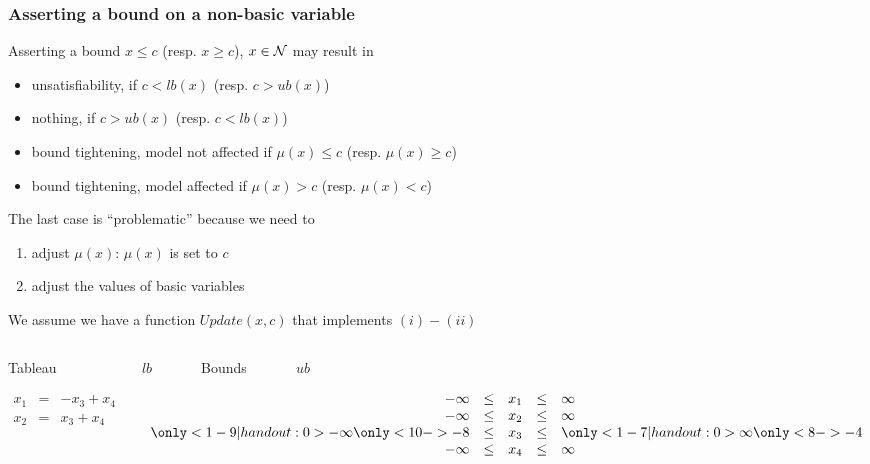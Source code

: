 \begin{frame}
  \frametitle{Asserting a bound on a non-basic variable}

  \scriptsize

  Asserting a bound $x \leq c$ (resp. $x \geq c$), $x \in \mathcal{N}$ may result in \pause
  \begin{itemize}
    \item unsatisfiability, if $c < lb(x)$ (resp. $c > ub(x)$) \pause
    \item nothing, if $c > ub(x)$ (resp. $c < lb(x)$) \pause
    \item bound tightening, model not affected if $\mu(x) \leq c$ (resp. $\mu(x) \geq c$) \pause
    \item bound tightening, model affected if $\mu(x) > c$ (resp. $\mu(x) < c$) \pause
  \end{itemize}
  \vfill
  The last case is ``problematic'' because we need to 
  \begin{enumerate}[$(i)$]
    \item adjust $\mu(x)$: $\mu(x)$ is set to $c$ 
    \item adjust the values of basic variables
  \end{enumerate}
  We assume we have a function $Update(x,c)$ that implements $(i)-(ii)$
  \vfill \pause
  \begin{columns}

  \begin{column}{.4\textwidth}
  \begin{center}
  Tableau
  \end{center}
  $$
  \begin{array}{rcl}
    x_1 & = & - x_3 + x_4  \\ 
    x_2 & = &   x_3 + x_4  \\ 
    \\
    \\
  \end{array}
  $$
  \end{column}

  \begin{column}{.3\textwidth}
  \begin{center}
  $lb$~~~~~~~Bounds~~~~~~~$ub$
  \end{center}
  $$
  \begin{array}{rcccl}
    - \infty & \leq & x_1 & \leq & \infty \\
    - \infty & \leq & x_2 & \leq & \infty \\
    \only<1-9|handout:0>{-\infty}\only<10->{-8} & \leq & x_3 & \leq & \only<1-7|handout:0>{\infty}\only<8->{-4} \\
    - \infty & \leq & x_4 & \leq & \infty 
  \end{array}
  $$
  \end{column}


\end{columns}
\end{frame}
